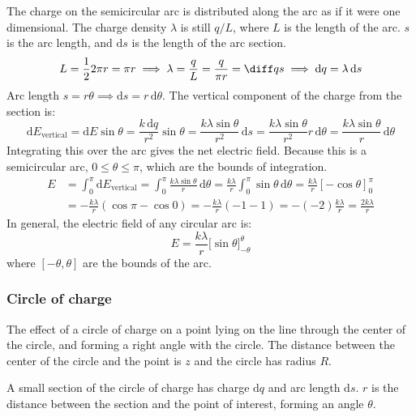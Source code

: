 \documentclass{article}
\begin{document}
The charge on the semicircular arc is distributed along the arc as if it were one dimensional. The charge density $\lambda$ is still $q/L$, where $L$ is the length of the arc. $s$ is the arc length, and $\mathrm{d}s$ is the length of the arc section.
\begin{equation*}
    L=\frac12 2\pi r=\pi r
	\implies \lambda=\frac{q}{L}=\frac{q}{\pi r}=\diff qs
	\implies
	\mathrm{d}q
	=\lambda \,\mathrm{d}s
\end{equation*}
Arc length $s=r\theta \implies \mathrm{d}s=r \,\mathrm{d}\theta$. The vertical component of the charge from the section is:
\begin{equation*}
	\mathrm{d}E_\text{vertical}
	=\mathrm{d}E\sin\theta
	=\frac{k \,\mathrm{d}q}{r^2}\sin\theta
	=\frac{k \lambda\sin\theta}{r^2}\,\mathrm{d}s
	=\frac{k \lambda\sin\theta}{r^2}r\,\mathrm{d}\theta
	=\frac{k \lambda\sin\theta}{r}\,\mathrm{d}\theta
\end{equation*}
Integrating this over the arc gives the net electric field. Because this is a semicircular arc, $0\leq \theta\leq \pi$, which are the bounds of integration.
\begin{align*}
	E 
	&=\int_{0}^{\pi}\mathrm{d}E_\text{vertical}
	=\int_{0}^{\pi}\frac{k\lambda \sin\theta}{r}\,\mathrm{d}\theta
	=\frac{k\lambda}{r}\int_{0}^{\pi}\sin\theta\,\mathrm{d}\theta
	=\frac{k\lambda}{r}\left[-\cos\theta\right]_{0}^{\pi} \\
	&=-\frac{k\lambda}{r}\left( \cos\pi-\cos0 \right)
	=-\frac{k\lambda}{r}\left( -1-1 \right)
	=-(-2)\frac{k\lambda}{r}
	=\boxed{\frac{2k\lambda}{r}}
\end{align*}
In general, the electric field of any circular arc is:
\begin{equation*}
	E=\frac{k\lambda}{r}\Big[\sin\theta\Big]_{-\theta}^{\theta}
\end{equation*}
where $[-\theta,\theta]$ are the bounds of the arc.

\subsubsection{Circle of charge}

The effect of a circle of charge on a point lying on the line through the center of the circle, and forming a right angle with the circle. The distance between the center of the circle and the point is $z$ and the circle has radius $R$.

A small section of the circle of charge has charge $\mathrm{d}q$ and arc length $\mathrm{d}s$. $r$ is the distance between the section and the point of interest, forming an angle $\theta$.
\end{document}
